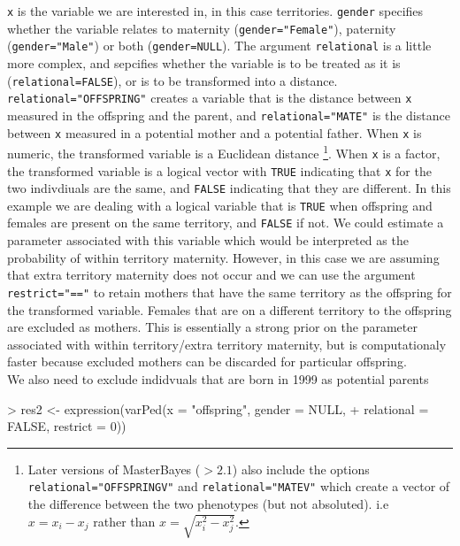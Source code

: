 \documentclass{article}
\begin{document}
\texttt{x} is the variable we are interested in, in this case territories.  \texttt{gender} specifies whether the variable relates to maternity (\texttt{gender="Female"}), paternity (\texttt{gender="Male"}) or both (\texttt{gender=NULL}). The argument \texttt{relational} is a little more complex, and sepcifies whether the variable is to be treated as it is (\texttt{relational=FALSE}), or is to be transformed into a distance.  \texttt{relational="OFFSPRING"} creates a variable that is the distance between \texttt{x} measured in the offspring and the parent, and \texttt{relational="MATE"} is the distance between \texttt{x} measured in a potential mother and a potential father.  When \texttt{x} is numeric, the transformed variable is a Euclidean distance \footnote{Later versions of MasterBayes ($>2.1$) also include the options \texttt{relational="OFFSPRINGV"} and \texttt{relational="MATEV"} which create a vector of the difference between the two phenotypes (but not absoluted). i.e $x=x_{i}-x_{j}$ rather than $x=\sqrt{x^{2}_{i}-x^{2}_{j}}$.}. When \texttt{x} is a factor, the transformed variable is a logical vector with \texttt{TRUE} indicating that \texttt{x} for the two indivdiuals are the same, and \texttt{FALSE} indicating that they are different.  In this example we are dealing with a logical variable that is \texttt{TRUE} when offspring and females are present on the same territory, and \texttt{FALSE} if not. We could estimate a parameter associated with this variable which would be interpreted as the probability of within territory maternity.  However, in this case we are assuming that extra territory maternity does not occur and we can use the argument \texttt{restrict="=="} to retain mothers that have the same territory as the offspring for the transformed variable. Females that are on a different territory to the offspring are excluded as mothers. This is essentially a strong prior on the parameter associated with within territory/extra territory maternity, but is computationaly faster because excluded mothers can be discarded for particular offspring.\\

We also need to exclude indidvuals that are born in 1999 as potential parents
 
\begin{Schunk}
\begin{Sinput}
> res2 <- expression(varPed(x = "offspring", gender = NULL, 
+     relational = FALSE, restrict = 0))
\end{Sinput}
\end{Schunk}
\end{document}
